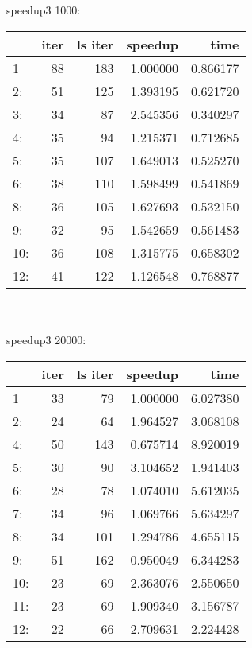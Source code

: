 \documentclass[11pt,a4paper]{article}
\begin{document}
\\ 
\\ 
speedup3 1000:
\\ 
\begin{tabular}{lrrrr}
\toprule
{} &  iter &  ls iter &   speedup &      time \\
\midrule
1   &    88 &      183 &  1.000000 &  0.866177 \\
2:  &    51 &      125 &  1.393195 &  0.621720 \\
3:  &    34 &       87 &  2.545356 &  0.340297 \\
4:  &    35 &       94 &  1.215371 &  0.712685 \\
5:  &    35 &      107 &  1.649013 &  0.525270 \\
6:  &    38 &      110 &  1.598499 &  0.541869 \\
8:  &    36 &      105 &  1.627693 &  0.532150 \\
9:  &    32 &       95 &  1.542659 &  0.561483 \\
10: &    36 &      108 &  1.315775 &  0.658302 \\
12: &    41 &      122 &  1.126548 &  0.768877 \\
\bottomrule
\end{tabular}
\\ 
\\ 
speedup3 20000:
\\ 
\begin{tabular}{lrrrr}
\toprule
{} &  iter &  ls iter &   speedup &      time \\
\midrule
1   &    33 &       79 &  1.000000 &  6.027380 \\
2:  &    24 &       64 &  1.964527 &  3.068108 \\
4:  &    50 &      143 &  0.675714 &  8.920019 \\
5:  &    30 &       90 &  3.104652 &  1.941403 \\
6:  &    28 &       78 &  1.074010 &  5.612035 \\
7:  &    34 &       96 &  1.069766 &  5.634297 \\
8:  &    34 &      101 &  1.294786 &  4.655115 \\
9:  &    51 &      162 &  0.950049 &  6.344283 \\
10: &    23 &       69 &  2.363076 &  2.550650 \\
11: &    23 &       69 &  1.909340 &  3.156787 \\
12: &    22 &       66 &  2.709631 &  2.224428 \\
\bottomrule
\end{tabular}
\end{document}

